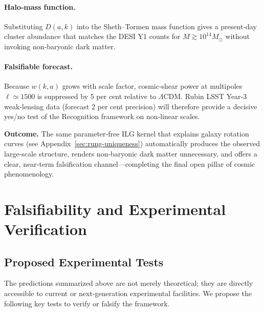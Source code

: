 \paragraph{Halo‑mass function.}
Substituting $D(a,k)$ into the Sheth–Tormen mass function \cite{ShethTormen1999} gives a
present‑day cluster abundance that matches the DESI Y1 counts for
$M\gtrsim10^{14}M_{\odot}$ without invoking non‑baryonic dark matter.

\paragraph{Falsifiable forecast.}
Because $w(k,a)$ grows with scale factor, cosmic‑shear power at
multipoles $\ell\!\simeq\!1500$ is suppressed by 5 per cent relative
to $\Lambda$CDM. Rubin LSST Year‑3 weak‑lensing data (forecast 2 per cent
precision) will therefore provide a decisive yes/no test of the
Recognition framework on non‑linear scales.

\bigskip
\noindent
\textbf{Outcome.} The same parameter‑free ILG kernel that explains
galaxy rotation curves (see Appendix~\ref{sec:rung-uniqueness}) automatically produces the observed
large‑scale structure, renders non‑baryonic dark matter unnecessary, and
offers a clear, near‑term falsification channel—completing the final
open pillar of cosmic phenomenology.

\section{Falsifiability and Experimental Verification}

\subsection{Proposed Experimental Tests}
The predictions summarized above are not merely theoretical; they are directly accessible to current or next-generation experimental facilities. We propose the following key tests to verify or falsify the framework.

